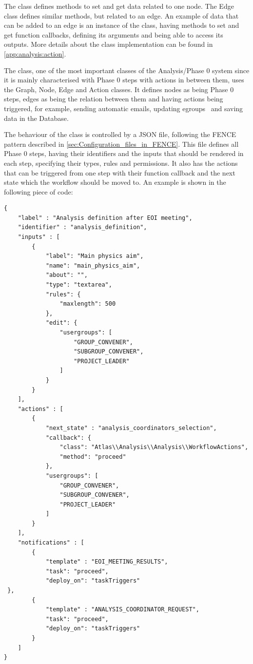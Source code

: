 The  class defines methods to set and get data related to one node. The Edge class defines similar methods, but related to an edge. An example of data that can be added to an edge is an instance of the  class, having methods to set and get function callbacks, defining its arguments and being able to access its outputs.
More details about the  class implementation can be found in \cref{app:analysis:action}.

The  class, one of the most important classes of the Analysis/Phase 0 system since it is mainly characterised with Phase 0 steps with actions in between them, uses the Graph, Node, Edge and Action classes. It defines nodes as being Phase 0 steps, edges as being the relation between them and having actions being triggered, for example, sending automatic emails, updating egroups~\cite{egroups} and saving data in the Database.

The behaviour of the  class is controlled by a JSON file, following the FENCE pattern described in \cref{sec:Configuration_files_in_FENCE}.
This file defines all Phase 0 steps, having their identifiers and the inputs that should be rendered in each step, specifying their types, rules and permissions.
It also has the actions that can be triggered from one step with their function callback and the next state which the workflow should be moved to. An example is shown in the following piece of code:

\begin{lstlisting}
{
    "label" : "Analysis definition after EOI meeting",
    "identifier" : "analysis_definition",
    "inputs" : [
        {
            "label": "Main physics aim",
            "name": "main_physics_aim",
            "about": "",
            "type": "textarea",
            "rules": {
                "maxlength": 500
            },
            "edit": {
                "usergroups": [
                    "GROUP_CONVENER",
                    "SUBGROUP_CONVENER",
                    "PROJECT_LEADER"
                ]
            }
        }
    ],
    "actions" : [
        {
            "next_state" : "analysis_coordinators_selection",
            "callback": {
                "class": "Atlas\\Analysis\\Analysis\\WorkflowActions",
                "method": "proceed"
            },
            "usergroups": [
                "GROUP_CONVENER",
                "SUBGROUP_CONVENER",
                "PROJECT_LEADER"
            ]
        }
    ],
    "notifications" : [
        {
            "template" : "EOI_MEETING_RESULTS",
            "task": "proceed",
            "deploy_on": "taskTriggers"
 },
        {
            "template" : "ANALYSIS_COORDINATOR_REQUEST",
            "task": "proceed",
            "deploy_on": "taskTriggers"
        }
    ]
}
\end{lstlisting}

